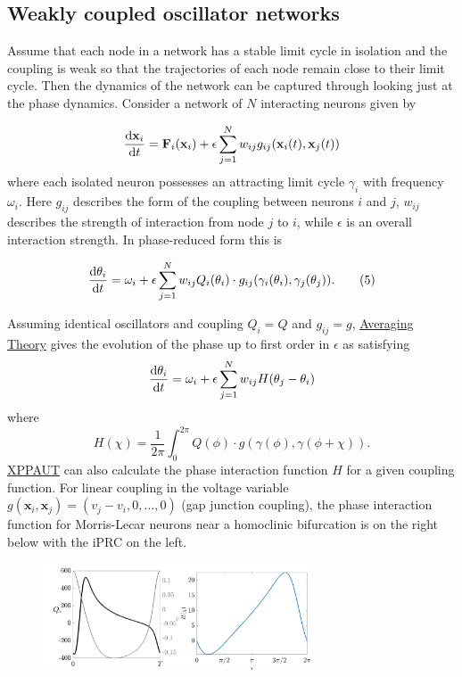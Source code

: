 \documentclass[11pt]{article}
\begin{document}
    \hypertarget{weakly-coupled-oscillator-networks}{%
\subsection{Weakly coupled oscillator
networks}\label{weakly-coupled-oscillator-networks}}

Assume that each node in a network has a stable limit cycle in isolation
and the coupling is weak so that the trajectories of each node remain
close to their limit cycle. Then the dynamics of the network can be
captured through looking just at the phase dynamics. Consider a network
of \(N\) interacting neurons given by

\[\frac{{\rm d}\mathbf{x}_i}{{\rm d} t} = \mathbf{F}_i(\mathbf{x}_i) + \epsilon \sum_{j=1}^N w_{ij} g_{ij}(\mathbf{x}_i(t), \mathbf{x}_j(t))\]
where each isolated neuron possesses an attracting limit cycle
\(\gamma_i\) with frequency \(\omega_i\). Here \(g_{ij}\) describes the
form of the coupling between neurons \(i\) and \(j\), \(w_{ij}\)
describes the strength of interaction from node \(j\) to \(i\), while
\(\epsilon\) is an overall interaction strength. In phase-reduced form
this is

\[ \frac{{\rm d}\theta_i}{{\rm d} t} = \omega_i + \epsilon \sum_{j=1}^N w_{ij} Q_i(\theta_i) \cdot g_{ij}(\gamma_i(\theta_i), \gamma_j(\theta_j)).\tag{5}\]

Assuming identical oscillators and coupling \(Q_i = Q\) and
\(g_{ij}=g\),
\href{http://www.scholarpedia.org/article/Averaging}{Averaging Theory}
gives the evolution of the phase up to first order in \(\epsilon\) as
satisfying
\[ \frac{{\rm d}\theta_i}{{\rm d} t} = \omega_i + \epsilon \sum_{j=1}^N w_{ij} H(\theta_j - \theta_i)\]
where
\[H(\chi) = \frac{1}{2\pi} \int_0^{2\pi} Q(\phi) \cdot g(\gamma(\phi), \gamma(\phi+\chi)).\]
\href{https://sites.pitt.edu/~phase/bard/bardware/xpp/xpp.html}{XPPAUT}
can also calculate the phase interaction function \(H\) for a given
coupling function. For linear coupling in the voltage variable
\(g(\mathbf{x}_i, \mathbf{x}_j) = (v_j-v_i, 0, \ldots, 0)\) (gap
junction coupling), the phase interaction function for Morris-Lecar
neurons near a homoclinic bifurcation is on the right below with the
iPRC on the left.

 \begin{figure}[!h]
  \centering
  \includegraphics[width=8cm]{HML.png}
\end{figure}
\end{document}
